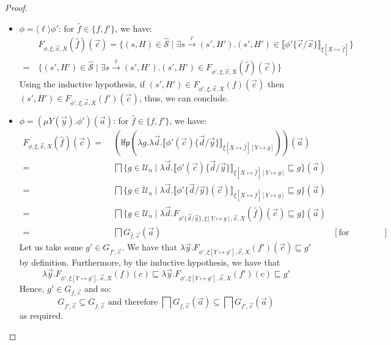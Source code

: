\documentclass[10pt,a4paper]{article}
\theoremstyle{definition}
\theoremstyle{remark}
\newcommand\diam[1]{\langle#1\rangle}
\newcommand\sem[2][\xi]{\llbracket#2\rrbracket_{#1}}
\newcommand\Scal{\mathcal{S}}
\newcommand\Ucal{\mathcal{U}}
\newcommand\gap{&\,\,}
\newcommand\lfp{\mathsf{lfp}}
\newcommand{\F}[4][\xi]{F_{#2,#1,#3,#4}}
\newcommand\fstates[0]{\hat{\Scal}}
\begin{document}
\begin{proof}
\begin{itemize}
		\item $\phi = \diam{\ell} \phi'$: for $\hat f \in \{f,f'\}$, we have:
		\begin{align*}
		&\F{\phi}{\vec x}{X}(\hat f)(\vec c) = \{(s, H) \in \fstates \mid \exists s\xrightarrow{\ell}(s', H').(s', H')\in \sem[{\xi[X\mapsto \hat f]}]{\phi'\{\vec c / \vec x\}} \} 
		\\=\ & \{(s', H') \in \fstates \mid \exists s\xrightarrow{\ell}(s', H').(s', H') \in \F{\phi'}{\vec x}{X}(\hat f)(\vec c)\}
		\end{align*}
		Using the inductive hypothesis, if $(s', H')\in \F{\phi'}{\vec x}{X}(f)(\vec c)$ then $(s', H')\in \F{\phi'}{\vec x}{X}(f')(\vec c)$,
		thus, we can conclude.
		\item $\phi = (\mu Y(\vec y).\phi')(\vec a)$: for $\hat f \in \{f,f'\}$, we have:
    	\begin{align*}
			\F{\phi}{\vec x}{X}(\hat f)(\vec c) =\gap (\lfp(\lambda g. \lambda \vec d.\sem[{\xi[X\mapsto \hat f][Y\mapsto g]}]{\phi'(\vec c)\{\vec d/\vec y\}}))(\vec a) \\
						=\gap \bigsqcap \{g\in \Ucal_n\mid 
			\lambda \vec d. \sem[{\xi[X\mapsto \hat f][Y\mapsto g]}]{\phi'(\vec c)\{\vec d/\vec y\}}\sqsubseteq g\}(\vec a)\\
			=\gap\bigsqcap \{g\in \Ucal_n\mid 
			\lambda \vec d. \sem[{\xi[X\mapsto \hat f][Y\mapsto g]}]{\phi'\{\vec d/\vec y\}(\vec c)}\sqsubseteq g\}(\vec a)\\
			=\gap \bigsqcap\{g \in \Ucal_n\mid \lambda \vec d.\F[{\xi[Y\mapsto g]}]{\phi'\{\vec d/\vec y\}}{\vec x}{X}(\hat f)(\vec c) \sqsubseteq g\}(\vec a)\\
			=\gap \bigsqcap G_{\hat f, \vec c}(\vec a) &[\text{for economy}]
		\end{align*}
		Let us take some $ g' \in G_{f', \vec c}$.
		We have that $\lambda \vec y.\F[{\xi[Y\mapsto g']}]{\phi'}{\vec x}{X}(f')(\vec c) \sqsubseteq g'$ by definition.
		Furthermore, by the inductive hypothesis,
		we have that 
		$$\lambda \vec y.\F[{\xi[Y\mapsto g']}]{\phi'}{\vec x}{X}(f)(c)\sqsubseteq\lambda \vec y.\F[{\xi[Y\mapsto g']}]{\phi'}{\vec x}{X}(f')(c) \sqsubseteq g'$$
		Hence, $g' \in G_{f, \vec c}$ and so: 
		\[
			G_{f', \vec c} \subseteq G_{f, \vec c} \text{ and therefore } \bigsqcap G_{f, \vec c} (\vec a) \subseteq \bigsqcap G_{f', \vec c} (\vec a)
		\]
		as required.
	\end{itemize}

		
\end{proof}
	
\end{document}
